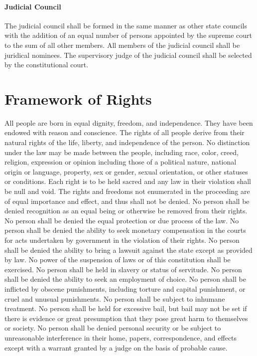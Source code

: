 \documentclass{article}
\begin{document}
\paragraph{Judicial Council}
The judicial council shall be formed in the same manner as other state councils with the addition of an equal number of persons appointed by the supreme court to the sum of all other members. All members of the judicial council shall be juridical nominees. The supervisory judge of the judicial council shall be selected by the constitutional court.
\section{Framework of Rights}
All people are born in equal dignity, freedom, and independence. They have been endowed with reason and conscience. The rights of all people derive from their natural rights of the life, liberty, and independence of the person. 
No distinction under the law may be made between the people, including race, color, creed, religion, expression or opinion including those of a political nature, national origin or language, property, sex or gender, sexual orientation, or other statuses or conditions.
Each right is to be held sacred and any law in their violation shall be null and void. The rights and freedoms not enumerated in the proceeding are of equal importance and effect, and thus shall not be denied.
No person shall be denied recognition as an equal being or otherwise be removed from their rights. No person shall be denied the equal protection or due process of the law.
No person shall be denied the ability to seek monetary compensation in the courts for acts undertaken by government in the violation of their rights. No person shall be denied the ability to bring a lawsuit against the state except as provided by law.
No power of the suspension of laws or of this constitution shall be exercised.
No person shall be held in slavery or status of servitude. No person shall be denied the ability to seek an employment of choice.
No person shall be inflicted by obscene punishments, including torture and capital punishment, or cruel and unusual punishments. No person shall be subject to inhumane treatment.
No person shall be held for excessive bail, but bail may not be set if there is evidence or great presumption that they pose great harm to themselves or society.
No person shall be denied personal security or be subject to unreasonable interference in their home, papers, correspondence, and effects except with a warrant granted by a judge on the basis of probable cause.
\end{document}
